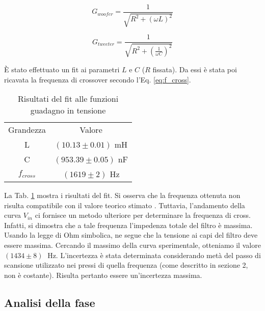 \documentclass[../Relazione_circuiti]{subfiles}
\begin{document}
  \begin{equation}
    \label{eq:gain_woofer}
    G_{woofer} = \frac{1}{\sqrt{R^2+(\omega L)^2}}
  \end{equation}

  \begin{equation}
    \label{eq:gain_tweeter}
    G_{tweeter} = \frac{1}{\sqrt{R^2+(\frac{1}{\omega C})^2}}
  \end{equation}



  È stato effettuato un fit ai parametri $L$ e $C$ ($R$ fissata).
  Da essi è stata poi ricavata la frequenza di crossover secondo l'Eq. \eqref{eq:f_cross}.

  \begin{table}[H]
    \centering

    \begin{tabular}{c | c }

      Grandezza & Valore                 \\

      L         & $(10.13 \pm 0.01)$ mH  \\
      C         & $(953.39 \pm 0.05)$ nF \\
      $f_{cross}$ & $(1619 \pm 2)$ Hz

    \end{tabular}

    \caption{Risultati del fit alle funzioni guadagno in tensione}
    \label{tab:fit_amplitude}

  \end{table}

  La Tab. \ref{tab:fit_amplitude} mostra i risultati del fit.
  Si osserva che la frequenza ottenuta non risulta compatibile con il valore teorico stimato \theoryF.
  Tuttavia, l'andamento della curva $V_{in}$ ci fornisce un metodo ulteriore per determinare la frequenza di cross.
  Infatti, si dimostra che a tale frequenza l'impedenza totale del filtro è massima.
  Usando la legge di Ohm simbolica, ne segue che la tensione ai capi del filtro deve essere massima.
  Cercando il massimo della curva sperimentale, otteniamo il valore $(1434 \pm 8) \;$ Hz.
  L'incertezza è stata determinata considerando metà del passo di scansione utilizzato nei pressi di quella frequenza
  (come descritto in sezione 2, non è costante). Risulta pertanto essere un'incertezza massima.

\subsection{Analisi della fase}
\end{document}
